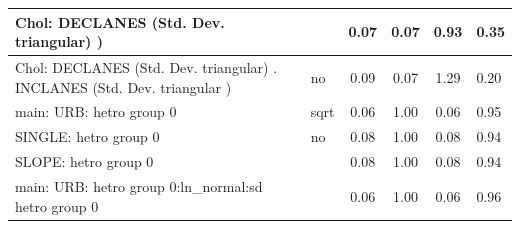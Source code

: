 \begin{table}
\begin{center}
\begin{tabular}{|l|l|c|c|c|l|}
			\hline
			 Chol: DECLANES (Std. Dev. triangular) ) &  & 0.07 & 0.07 & 0.93 & 0.35 \\
			\hline
			 Chol: DECLANES (Std. Dev. triangular) . INCLANES (Std. Dev.   triangular ) & no & 0.09 & 0.07 & 1.29 & 0.20 \\
			\hline
			main: URB: hetro group 0 & sqrt & 0.06 & 1.00 & 0.06 & 0.95 \\
			\hline
			SINGLE: hetro group 0 & no & 0.08 & 1.00 & 0.08 & 0.94 \\
			\hline
			SLOPE: hetro group 0 &  & 0.08 & 1.00 & 0.08 & 0.94 \\
			\hline
			main: URB: hetro group 0:ln_normal:sd  hetro group 0 &  & 0.06 & 1.00 & 0.06 & 0.96 \\
			\hline
		\end{tabular}
	\end{center}
\end{table}
